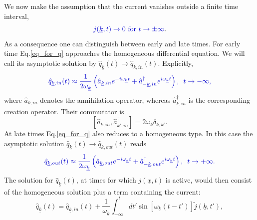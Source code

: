 \documentclass[12pt, titlepage]{article}
\begin{document}
We now make the assumption that the current vanishes outside a finite time interval,
\begin{equation}
\textcolor[RGB]{0,0,204}{
j(\underline{k},t)\rightarrow 0 \text{ for } t\rightarrow \pm \infty
}.
\end{equation}
As a consequence one can distinguish between early and late times. For early time  Eq.\enskip\eqref{eq_for_q} approaches the homogeneous differential equation. We will call its asymptotic solution by $ \hat{q}_{\underline{k}}(t) \rightarrow \hat{q}_{k,in}(t) $. Explicitly, 
\begin{equation}\label{q_In_operators}
 \textcolor[RGB]{0,0,204}{
 \hat{q}_{\underline{k},in}(t) 
  \approx
  \dfrac{1}{2\omega_{\underline{k}}}\left(
	\hat{a}_{\underline{k},in} 
	e^{-i\omega_{\underline{k}}t}
	+
	\hat{a}^{\dagger}_{-\underline{k},in}  
	e^{i\omega_{\underline{k}}t}
  \right) 
  ,
   \enskip t\rightarrow -\infty,}
\end{equation}
where $ \hat{a}_{\underline{k},in} $ denotes the annihilation operator, whereas $ \hat{a}^{\dagger}_{\underline{k},in} $ is the corresponding creation operator. Their commutator is
\begin{equation}\label{crea_anni_commutator}
\left[ 
\hat{a}_{\underline{k},in}
,
\hat{a}^{\dagger}_{\underline{k'},in}
\right] 
=2\omega_{\underline{k}}\delta_{\underline{k},\underline{k'}}
.
\end{equation}
At late times Eq.\enskip\eqref{eq_for_q} also reduces to a homogeneous type. In this case the asymptotic solution $ \hat{q}_{\underline{k}}(t) \rightarrow \hat{q}_{k,out}(t) $ reads
\begin{equation}\label{q_Out_operators}
 \textcolor[RGB]{0,0,204}{
 \hat{q}_{\underline{k},out}(t) 
  \approx
  \dfrac{1}{2\omega_{\underline{k}}}\left(
	\hat{a}_{\underline{k},out} 
	e^{-i\omega_{\underline{k}}t}
	+
	\hat{a}^{\dagger}_{-\underline{k},out}  
	e^{i\omega_{\underline{k}}t}
  \right) 
  ,
  \enskip t\rightarrow +\infty.}
\end{equation}
The solution for $ \hat{q}_{\underline{k}}(t) $, at times for which $ j(\underline{x},t) $ is active, would then consist of the homogeneous solution plus a term containing the current:
\begin{equation}\label{q_full}
 \hat{q}_{\underline{k}}(t) 
  =
  \hat{q}_{\underline{k},in}(t) 
  +
    \dfrac{1}{\omega_{\underline{k}}}
    \int^{t}_{-\infty}
    dt'
    \sin\left[\omega_{\underline{k}}(t-t') \right] \tilde{j}(\underline{k},t')
    ,
\end{equation}
\end{document}
